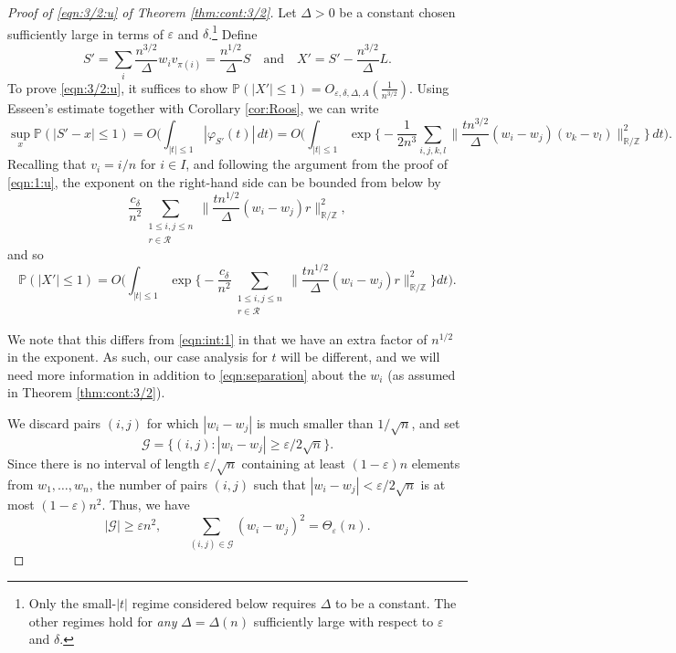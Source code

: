 \documentclass[reqno]{amsart}
\newcommand\R{{\mathbb{R}}}
\newcommand\Z{{\mathbb{Z}}}
\renewcommand\P{{\mathbb{P}}}
\newcommand\eps{{\varepsilon}}
\newcommand\CG{{\mathcal G}}
\newcommand\CR{{\mathcal R}}
\theoremstyle{plain}
\theoremstyle{definition}
\begin{document}
\begin{proof}[Proof of \eqref{eqn:3/2:u} of Theorem \ref{thm:cont:3/2}]
Let $\Delta>0$ be a constant chosen sufficiently large in terms of $\eps$ and $\delta$.\footnote{Only the small-$|t|$ regime considered below requires $\Delta$ to be a constant. The other regimes hold for \emph{any} $\Delta = \Delta(n)$ sufficiently large with respect to $\eps$ and $\delta$.} Define
\[
S' = \sum_{i} \frac{n^{3/2}}{\Delta}w_{i} v_{\pi(i)} =\frac{n^{1/2}}{\Delta} S
\quad\text{and}\quad
X' = S' - \frac{n^{3/2}}{\Delta}L.
\]
To prove \eqref{eqn:3/2:u}, it suffices to show $\P(|X'| \le 1)=O_{\eps,\delta,\Delta,A}(\frac{1}{n^{3/2}})$.
Using Esseen's estimate together with Corollary \ref{cor:Roos}, we can write
\[
\sup_{x} \P(|S' - x| \le 1)
= O\Big(\int_{|t| \le 1} |\varphi_{S'}(t)| \, dt\Big)
=O\Big(\int_{|t| \le 1} \exp\Big\{- \frac{1}{2n^{3}} \sum_{i,j,k,l} \Big\|\frac{t n^{3/2}}{\Delta} (w_{i}-w_{j})(v_{k}-v_{l})\Big\|_{\R/\Z}^{2}\Big\} \, dt\Big).
\]
Recalling that $v_i = i/n$ for $i\in I$, and following the argument from the proof of \eqref{eqn:1:u}, the exponent on the right-hand side can be bounded from below by
\[
\frac{c_{\delta}}{n^{2}} \sum_{\substack{1 \le i,j \le n \\ r\in \CR}}
\Big\| \frac{t n^{1/2}}{\Delta} (w_{i} - w_{j}) r \Big\|_{\R/\Z}^{2},
\]
and so
\begin{equation}\label{eqn:int:3/2}
\P(|X'| \le 1)  
= O\Big(\int_{|t| \le 1} \exp\Big\{ -\frac{c_{\delta}}{n^{2}} \sum_{\substack{1 \le i,j \le n \\ r\in \CR}} \Big\| \frac{t n^{1/2}}{\Delta}(w_{i} - w_{j}) r \Big\|_{\R/\Z}^{2} \Big\} dt\Big).
\end{equation}

We note that this differs from \eqref{eqn:int:1} in that we have an extra factor of $n^{1/2}$ in the exponent.  
As such, our case analysis for $t$ will be different, and we will need more information in addition to \eqref{eqn:separation} about the $w_{i}$ (as assumed in Theorem \ref{thm:cont:3/2}).

We discard pairs $(i,j)$ for which $|w_{i}-w_{j}|$ is much smaller than $1/\sqrt{n}$, and set
\[
\CG = \{ (i,j) : |w_{i}-w_{j}| \ge \eps / 2\sqrt{n} \}.
\]
Since there is no interval of length $\eps/\sqrt{n}$ containing at least $(1-\eps)n$ elements from $w_{1},\dots,w_{n}$, the number of pairs $(i,j)$ such that $|w_{i}-w_{j}| < \eps/2\sqrt{n}$ is at most $(1-\eps)n^{2}$.
Thus, we have
\begin{equation}\label{eqn:3/2:u:starting}
|\CG|\ge \eps n^2, \qquad \sum_{(i,j)\in \CG} (w_{i}-w_{j})^{2} =\Theta_{\eps}(n).
\end{equation}


\end{proof}
\end{document}
